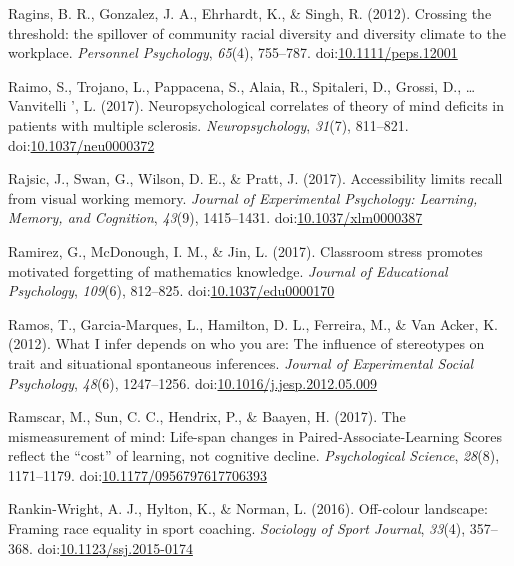 \documentclass[english,man]{apa6}
\begin{document}
\hypertarget{ref-Ragins2012}{}
Ragins, B. R., Gonzalez, J. A., Ehrhardt, K., \& Singh, R. (2012).
Crossing the threshold: the spillover of community racial diversity and
diversity climate to the workplace. \emph{Personnel Psychology},
\emph{65}(4), 755--787.
doi:\href{https://doi.org/10.1111/peps.12001}{10.1111/peps.12001}

\hypertarget{ref-Raimo2017}{}
Raimo, S., Trojano, L., Pappacena, S., Alaia, R., Spitaleri, D., Grossi,
D., \ldots{} Vanvitelli ', L. (2017). Neuropsychological correlates of
theory of mind deficits in patients with multiple sclerosis.
\emph{Neuropsychology}, \emph{31}(7), 811--821.
doi:\href{https://doi.org/10.1037/neu0000372}{10.1037/neu0000372}

\hypertarget{ref-Rajsic2017}{}
Rajsic, J., Swan, G., Wilson, D. E., \& Pratt, J. (2017). Accessibility
limits recall from visual working memory. \emph{Journal of Experimental
Psychology: Learning, Memory, and Cognition}, \emph{43}(9), 1415--1431.
doi:\href{https://doi.org/10.1037/xlm0000387}{10.1037/xlm0000387}

\hypertarget{ref-Ramirez2017}{}
Ramirez, G., McDonough, I. M., \& Jin, L. (2017). Classroom stress
promotes motivated forgetting of mathematics knowledge. \emph{Journal of
Educational Psychology}, \emph{109}(6), 812--825.
doi:\href{https://doi.org/10.1037/edu0000170}{10.1037/edu0000170}

\hypertarget{ref-Ramos2012}{}
Ramos, T., Garcia-Marques, L., Hamilton, D. L., Ferreira, M., \& Van
Acker, K. (2012). What I infer depends on who you are: The influence of
stereotypes on trait and situational spontaneous inferences.
\emph{Journal of Experimental Social Psychology}, \emph{48}(6),
1247--1256.
doi:\href{https://doi.org/10.1016/j.jesp.2012.05.009}{10.1016/j.jesp.2012.05.009}

\hypertarget{ref-Ramscar2017}{}
Ramscar, M., Sun, C. C., Hendrix, P., \& Baayen, H. (2017). The
mismeasurement of mind: Life-span changes in Paired-Associate-Learning
Scores reflect the ``cost'' of learning, not cognitive decline.
\emph{Psychological Science}, \emph{28}(8), 1171--1179.
doi:\href{https://doi.org/10.1177/0956797617706393}{10.1177/0956797617706393}

\hypertarget{ref-Rankin-Wright2016}{}
Rankin-Wright, A. J., Hylton, K., \& Norman, L. (2016). Off-colour
landscape: Framing race equality in sport coaching. \emph{Sociology of
Sport Journal}, \emph{33}(4), 357--368.
doi:\href{https://doi.org/10.1123/ssj.2015-0174}{10.1123/ssj.2015-0174}
\end{document}
